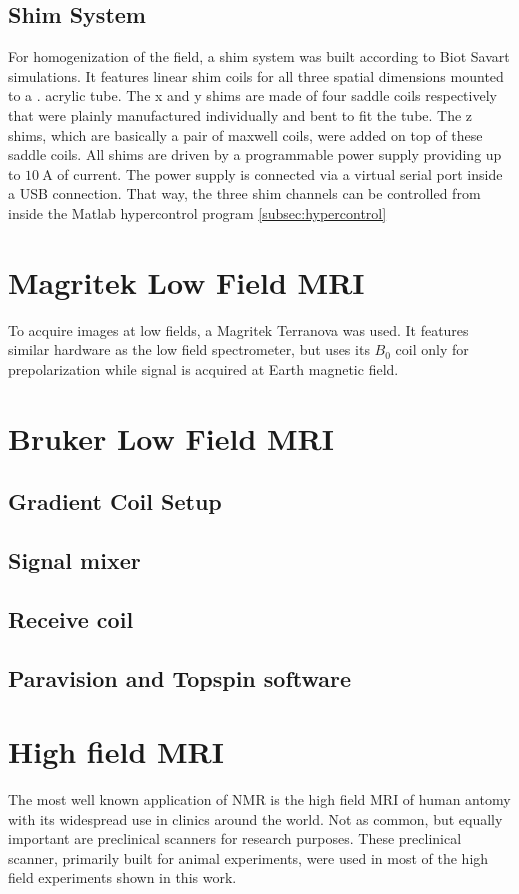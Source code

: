 		\subsection{Shim System}
			For homogenization of the field, a shim system was built according to Biot Savart
			simulations. It features linear shim coils for all three spatial dimensions mounted to a
			. acrylic tube. The x and y shims are made of four saddle coils respectively that
			were plainly manufactured individually and bent to fit the tube. The z shims, which are
			basically a pair of maxwell coils, were added on top of these saddle coils. All shims
			are driven by a  programmable power supply providing up to
			$\SI{10}{\ampere}$ of current. The power supply is connected via a virtual serial port inside
			a USB connection. That way, the three shim channels can be controlled from inside the
			Matlab hypercontrol program \ref{subsec:hypercontrol}
	\section{Magritek Low Field MRI}
		To acquire images at low fields, a Magritek Terranova  was used. It features
		similar hardware as the low field spectrometer, but uses its $B_0$ coil only for
		prepolarization while signal is acquired at Earth magnetic field.
	\section{Bruker Low Field MRI}
		\subsection{Gradient Coil Setup}
		\subsection{Signal mixer}
		\subsection{Receive coil}
		\subsection{Paravision and Topspin software}
	\section{High field MRI}
		The most well known application of NMR is the high field MRI of human antomy with its
		widespread use in clinics around the world. Not as common, but equally important are
		preclinical scanners for research purposes. These preclinical scanner, primarily built for
		animal experiments, were used in most of the high field experiments shown in this work.
